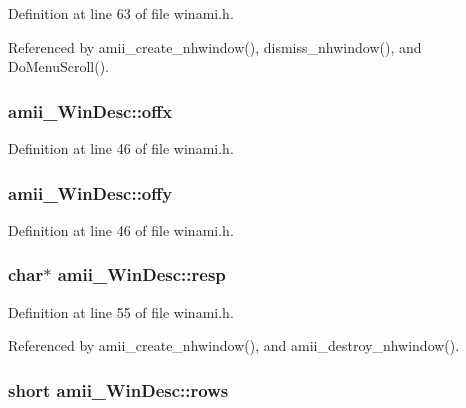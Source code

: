 Definition at line 63 of file winami.\+h.



Referenced by amii\+\_\+create\+\_\+nhwindow(), dismiss\+\_\+nhwindow(), and Do\+Menu\+Scroll().

\hypertarget{structamii__WinDesc_a86d17b0eef27f3993192a5ae457b308f}{
\subsubsection[{offx}]{ amii\+\_\+\+Win\+Desc\+::offx}}\label{structamii__WinDesc_a86d17b0eef27f3993192a5ae457b308f}


Definition at line 46 of file winami.\+h.

\hypertarget{structamii__WinDesc_a0d290575fc55a6cee56ab14b3a10d98e}{
\subsubsection[{offy}]{ amii\+\_\+\+Win\+Desc\+::offy}}\label{structamii__WinDesc_a0d290575fc55a6cee56ab14b3a10d98e}


Definition at line 46 of file winami.\+h.

\hypertarget{structamii__WinDesc_a7c77cae36fa87a80e7c5b0cf9ed8284f}{
\subsubsection[{resp}]{\setlength{\rightskip}{0pt plus 5cm}char$\ast$ amii\+\_\+\+Win\+Desc\+::resp}}\label{structamii__WinDesc_a7c77cae36fa87a80e7c5b0cf9ed8284f}


Definition at line 55 of file winami.\+h.



Referenced by amii\+\_\+create\+\_\+nhwindow(), and amii\+\_\+destroy\+\_\+nhwindow().

\hypertarget{structamii__WinDesc_a465b4a9c04b3c325f2af2722aac9c5f3}{
\subsubsection[{rows}]{\setlength{\rightskip}{0pt plus 5cm}short amii\+\_\+\+Win\+Desc\+::rows}}\label{structamii__WinDesc_a465b4a9c04b3c325f2af2722aac9c5f3}


